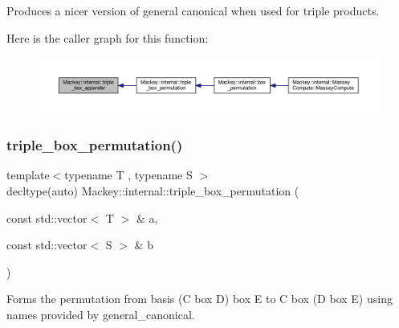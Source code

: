 Produces a nicer version of general canonical when used for triple products. 

Here is the caller graph for this function\+:\nopagebreak
\begin{figure}[H]
\begin{center}
\leavevmode
\includegraphics[width=350pt]{namespaceMackey_1_1internal_ac9c5122d0b7488b13f15bb6a7e03a9f8_icgraph}
\end{center}
\end{figure}
\mbox{\label{namespaceMackey_1_1internal_a2647c2357084142a1647364848db3205}} 
\subsubsection{\texorpdfstring{triple\+\_\+box\+\_\+permutation()}{triple\_box\_permutation()}}
{\footnotesize\ttfamily template$<$typename T , typename S $>$ \\
decltype(auto) Mackey\+::internal\+::triple\+\_\+box\+\_\+permutation (\begin{DoxyParamCaption}\item[{const std\+::vector$<$ T $>$ \&}]{a,  }\item[{const std\+::vector$<$ S $>$ \&}]{b }\end{DoxyParamCaption})}



Forms the permutation from basis (C box D) box E to C box (D box E) using names provided by general\+\_\+canonical. 

